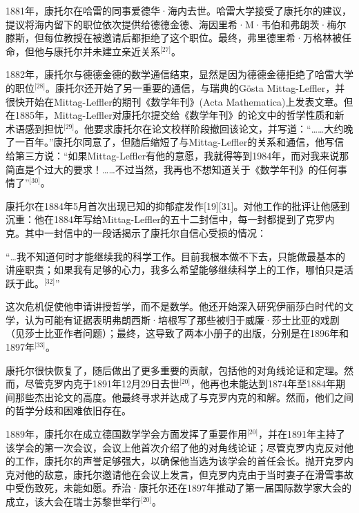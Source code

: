1881年，康托尔在哈雷的同事爱德华·海内去世。哈雷大学接受了康托尔的建议，提议将海内留下的职位依次提供给德德金德、海因里希·M·韦伯和弗朗茨·梅尔滕斯，但每位教授在被邀请后都拒绝了这个职位。最终，弗里德里希·万格林被任命，但他与康托尔并未建立亲近关系\(^\text{[27]}\)。

1882年，康托尔与德德金德的数学通信结束，显然是因为德德金德拒绝了哈雷大学的职位\(^\text{[28]}\)。康托尔还开始了另一重要的通信，与瑞典的Gösta Mittag-Leffler，并很快开始在Mittag-Leffler的期刊《数学年刊》(Acta Mathematica)上发表文章。但在1885年，Mittag-Leffler对康托尔提交给《数学年刊》的论文中的哲学性质和新术语感到担忧\(^\text{[29]}\)。他要求康托尔在论文校样阶段撤回该论文，并写道：“……大约晚了一百年。”康托尔同意了，但随后缩短了与Mittag-Leffler的关系和通信，他写信给第三方说：“如果Mittag-Leffler有他的意愿，我就得等到1984年，而对我来说那简直是个过大的要求！……不过当然，我再也不想知道关于《数学年刊》的任何事情了”\(^\text{[30]}\)。

康托尔在1884年5月首次出现已知的抑郁症发作[19][31]。对他工作的批评让他感到沉重：他在1884年写给Mittag-Leffler的五十二封信中，每一封都提到了克罗内克。其中一封信中的一段话揭示了康托尔自信心受损的情况：

“…我不知道何时才能继续我的科学工作。目前我根本做不下去，只能做最基本的讲座职责；如果我有足够的心力，我多么希望能够继续科学上的工作，哪怕只是活跃于此。\(^\text{[32]}\)”

这次危机促使他申请讲授哲学，而不是数学。他还开始深入研究伊丽莎白时代的文学，认为可能有证据表明弗朗西斯·培根写了那些被归于威廉·莎士比亚的戏剧（见莎士比亚作者问题）；最终，这导致了两本小册子的出版，分别是在1896年和1897年\(^\text{[33]}\)。

康托尔很快恢复了，随后做出了更多重要的贡献，包括他的对角线论证和定理。然而，尽管克罗内克于1891年12月29日去世\(^\text{[20]}\)，他再也未能达到1874年至1884年期间那些杰出论文的高度。他最终寻求并达成了与克罗内克的和解。然而，他们之间的哲学分歧和困难依旧存在。

1889年，康托尔在成立德国数学学会方面发挥了重要作用\(^\text{[20]}\)，并在1891年主持了该学会的第一次会议，会议上他首次介绍了他的对角线论证；尽管克罗内克反对他的工作，康托尔的声誉足够强大，以确保他当选为该学会的首任会长。抛开克罗内克对他的敌意，康托尔邀请他在会议上发言，但克罗内克由于当时妻子在滑雪事故中受伤致死，未能如愿。乔治·康托尔还在1897年推动了第一届国际数学家大会的成立，该大会在瑞士苏黎世举行\(^\text{[20]}\)。
